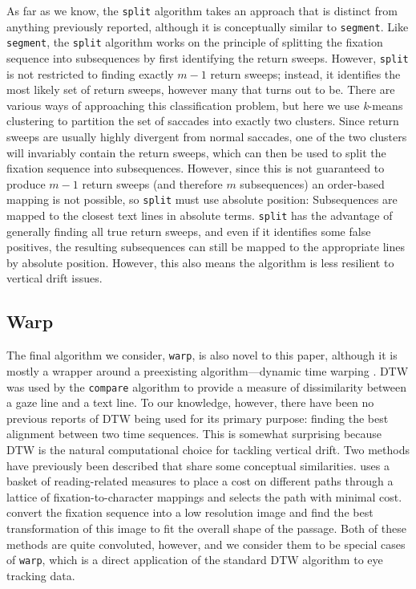 \documentclass[doc,biblatex]{apa7}
\begin{document}
As far as we know, the \texttt{split} algorithm takes an approach that is distinct from anything previously reported, although it is conceptually similar to \texttt{segment}. Like \texttt{segment}, the \texttt{split} algorithm works on the principle of splitting the fixation sequence into subsequences by first identifying the return sweeps. However, \texttt{split} is not restricted to finding exactly $m-1$ return sweeps; instead, it identifies the most likely set of return sweeps, however many that turns out to be. There are various ways of approaching this classification problem, but here we use \textit{k}-means clustering to partition the set of saccades into exactly two clusters. Since return sweeps are usually highly divergent from normal saccades, one of the two clusters will invariably contain the return sweeps, which can then be used to split the fixation sequence into subsequences. However, since this is not guaranteed to produce $m-1$ return sweeps (and therefore $m$ subsequences) an order-based mapping is not possible, so \texttt{split} must use absolute position: Subsequences are mapped to the closest text lines in absolute terms. \texttt{split} has the advantage of generally finding all true return sweeps, and even if it identifies some false positives, the resulting subsequences can still be mapped to the appropriate lines by absolute position. However, this also means the algorithm is less resilient to vertical drift issues.

\subsection{Warp}

The final algorithm we consider, \texttt{warp}, is also novel to this paper, although it is mostly a wrapper around a preexisting algorithm---dynamic time warping \parencite[DTW;][]{Vintsyuk:1968,Sakoe:1978}. DTW was used by the \texttt{compare} algorithm to provide a measure of dissimilarity between a gaze line and a text line. To our knowledge, however, there have been no previous reports of DTW being used for its primary purpose: finding the best alignment between two time sequences. This is somewhat surprising because DTW is the natural computational choice for tackling vertical drift. Two methods have previously been described that share some conceptual similarities. \textcite{Carl:2013} uses a basket of reading-related measures to place a cost on different paths through a lattice of fixation-to-character mappings and selects the path with minimal cost. \textcite{MartinezGomez:2012} convert the fixation sequence into a low resolution image and find the best transformation of this image to fit the overall shape of the passage. Both of these methods are quite convoluted, however, and we consider them to be special cases of \texttt{warp}, which is a direct application of the standard DTW algorithm to eye tracking data.
\end{document}
